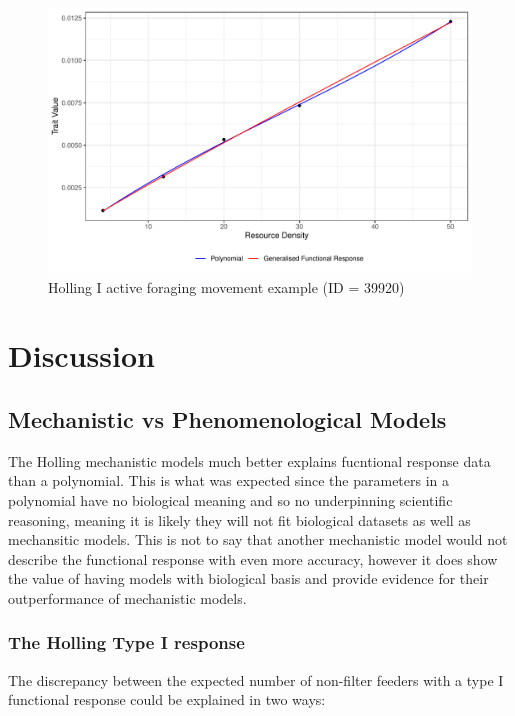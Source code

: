 \documentclass[11pt, a4paper, titlepage]{article}
\begin{document}
\begin{figure}[ht!]
	\centering\includegraphics[width=1\textwidth]{../Results/Holling1_example.pdf}
	\caption{Holling I active foraging movement example (ID = 39920)}
\end{figure}




\section{Discussion}

\subsection{Mechanistic vs Phenomenological Models}

The Holling mechanistic models much better explains fucntional response data than a polynomial. This is what was expected since the parameters in a polynomial have no biological meaning and so no underpinning scientific reasoning, meaning it is likely they will not fit biological datasets as well as mechansitic models.
This is not to say that another mechanistic model would not describe the functional response with even more accuracy, however it does show the value of having models with biological basis and provide evidence for their outperformance of mechanistic models.

\subsubsection{The Holling Type I response}

The discrepancy between the expected number of non-filter feeders with a type I functional response could be explained in two ways:
\end{document}
